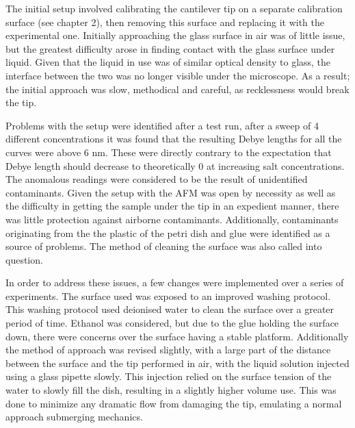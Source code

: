The initial setup involved calibrating the cantilever tip on a separate calibration surface (see chapter 2), then removing this surface and replacing it with the experimental one. Initially approaching the glass surface in air was of little issue, but the greatest difficulty arose in finding contact with the glass surface under liquid. Given that the liquid in use was of similar optical density to glass, the interface between the two was no longer visible under the microscope. As a result; the initial approach was slow, methodical and careful, as recklessness would break the tip. 

Problems with the setup were identified after a test run, after a sweep of 4 different concentrations it was found that the resulting Debye lengths for all the curves were above 6 nm. These were directly contrary to the expectation that Debye length should decrease to theoretically 0 at increasing salt concentrations. The anomalous readings were considered to be the result of unidentified contaminants. Given the setup with the AFM was open by necessity as well as the difficulty in getting the sample under the tip in an expedient manner, there was little protection against airborne contaminants. Additionally, contaminants originating from the the plastic of the petri dish and glue were identified as a source of problems. The method of cleaning the surface was also called into question. %

In order to address these issues, a few changes were implemented over a series of experiments. The surface used was exposed to an improved washing protocol. This washing protocol used deionised water to clean the surface over a greater period of time. Ethanol was considered, but due to the glue holding the surface down, there were concerns over the surface having a stable platform. Additionally the method of approach was revised slightly, with a large part of the distance between the surface and the tip performed in air, with the liquid solution injected using a glass pipette slowly. This injection relied on the surface tension of the water to slowly fill the dish, resulting in a slightly higher volume use. This was done to minimize any dramatic flow from damaging the tip, emulating a normal approach submerging mechanics. %

